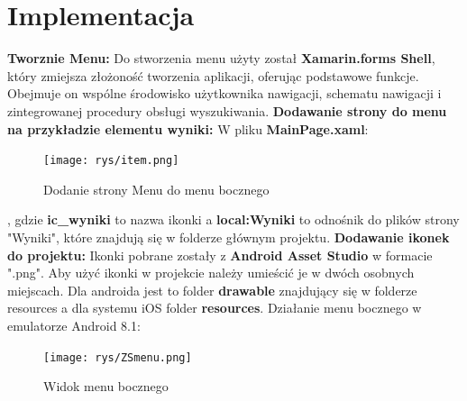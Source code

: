 	\newpage
\section{Implementacja}		%
\textbf{Tworznie Menu:} \newline 
Do stworzenia menu użyty został \textbf{Xamarin.forms Shell}, który zmiejsza złożoność tworzenia aplikacji, oferując podstawowe funkcje. Obejmuje on wspólne środowisko użytkownika nawigacji, schematu nawigacji i zintegrowanej procedury obsługi wyszukiwania.
\newline
\newline
\textbf{Dodawanie strony do menu na przykładzie elementu wyniki:}
\newline
W pliku \textbf{MainPage.xaml}:
\newline
\newline
\begin{figure}[!htb]
	\begin{center}
		\texttt{[image: rys/item.png]}
		\caption{Dodanie strony Menu do menu bocznego}
		\label{rys:rysunek012}
	\end{center}
\end{figure}
\newline
, gdzie \textbf{ic\_wyniki} to nazwa ikonki a \textbf{local:Wyniki} to odnośnik do plików strony "Wyniki", które znajdują się w folderze głównym projektu. 
\newline
\newline
\textbf{Dodawanie ikonek do projektu:} \newline
Ikonki pobrane zostały z \textbf{Android Asset Studio} w formacie ".png". \newline
Aby użyć ikonki w projekcie należy umieścić je w dwóch osobnych miejscach. Dla androida jest to folder \textbf{drawable} znajdujący się w folderze resources a dla systemu iOS folder \textbf{resources}.
\newline \newline
\newpage
Działanie menu bocznego w emulatorze Android 8.1:
\begin{figure}[!htb]
	\begin{center}
		\texttt{[image: rys/ZSmenu.png]}
		\caption{Widok menu bocznego}
		\label{rys:rysunek013}
	\end{center}
\end{figure}
